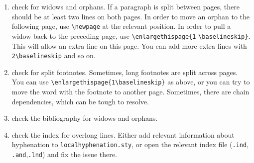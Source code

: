 \begin{enumerate}
\item check for widows and orphans. If a paragraph is split between pages, there should be at least two lines on both pages. In order to move  an orphan to the following page, use \verb+\newpage+ at the relevant position. In order to pull a widow back to the preceding page, use \verb+\enlargethispage{1+ \verb+\baselineskip}+. This will allow an extra line on this page. You can add more extra lines with \verb+2\baselineskip+ and so on.  
\item check for split footnotes. Sometimes, long footnotes are split across pages. You can use \verb+\enlargethispage{1\baselineskip}+ as above, or you can try to move the word with the footnote to another page. Sometimes, there are chain dependencies, which can be tough to resolve.
\item check the bibliography for widows and orphans. 
\item check the index for overlong lines. Either add relevant information about hyphenation to \verb+localhyphenation.sty+, or open the relevant index file (\verb+.ind+, \verb+.and+,\verb+.lnd+) and fix the issue there.  
\end{enumerate} 

